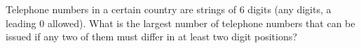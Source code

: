 Telephone numbers in a certain country are strings of $6$ digits (any digits, a leading $0$ allowed). What is the largest number of telephone numbers that can be issued if any two of them must differ in at least two digit positions?
